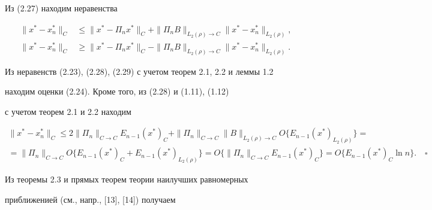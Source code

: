 Из (2.27) находим неравенства


\begin{align}


\|x^*-x^*_n\|_C&\le \|x^*-\Pi_nx^*\|_C+\|\Pi_nB\|_{L_2(\rho)\to


C}\|x^*-x^*_n\|_{L_2(\rho)}, \\


%


\|x^*-x^*_n\|_C&\ge


\|x^*-\Pi_nx^*\|_C-\|\Pi_nB\|_{L_2(\rho)\to C}\|x^*-x^*_n\|_{L_2(\rho)}.


\end{align}


Из неравенств (2.23), (2.28), (2.29) с учетом теорем 2.1, 2.2 и леммы 1.2


находим оценки (2.24). Кроме того, из (2.28) и (1.11), (1.12)


с учетом теорем 2.1 и 2.2 находим


\begin{multline*}


\|x^*-x^*_n\|_C\le 2\|\Pi_n\|_{C\to C} E_{n-1}(x^*)_C+


\|\Pi_n\|_{C\to C} \|B\|_{L_2(\rho)\to C}


O\{E_{n-1}(x^*)_{L_2(\rho)}\}= \\


%


=\|\Pi_n\|_{C\to C} O\{E_{n-1}(x^*)_C+E_{n-1}(x^*)_{L_2(\rho)}\}=


O\{\|\Pi_n\|_{C\to C} E_{n-1}(x^*)_C\}=O\{E_{n-1}(x^*)_C\ln n\}.


\quad\square


\end{multline*}





Из теоремы 2.3 и прямых теорем теории наилучших равномерных


приближенией (см., напр., [13], [14]) получаем





